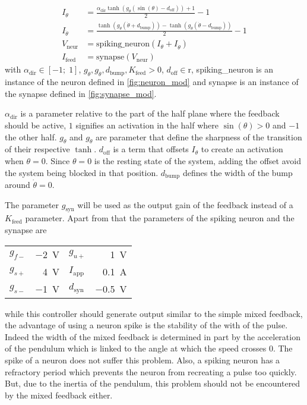 \begin{align}
    I_\theta &= \frac{\alpha_\text{dir}\tanh\left(g_\theta\left(\sin\left(\theta\right)-d_\text{off}\right)\right) + 1}{2} - 1\\
    I_{\dot{\theta}} &= \frac{\tanh\left(g_{\dot{\theta}}\left(\dot{\theta}+d_\text{bump}\right)\right) -\tanh\left(g_{\dot{\theta}}\left(\dot{\theta}-d_\text{bump}\right)\right)}{2}-1\\
    V_\text{neur} &= \text{spiking\_neuron}\left(I_\theta + I_{\dot{\theta}}\right)\\
    I_\text{feed} &= \text{synapse}\left(V_\text{neur}\right)
\end{align}
with $\alpha_\text{dir} \in \left[-1;\;1\right]$, $g_\theta, g_{\dot{\theta}}, d_\text{bump}, K_\text{feed} > 0$, $d_\text{off} \in \mathrm{r}$, spiking\_neuron is an instance of the neuron defined in \cref{fig:neuron_mod} and synapse is an instance of the synapse defined in \cref{fig:synapse_mod}.

$\alpha_\text{dir}$ is a parameter relative to the part of the half plane where the feedback should be active, $1$ signifies an activation in the half where $\sin\left(\theta\right)>0$ and $-1$ the other half. 
$g_\theta$ and $g_{\dot{\theta}}$ are parameter that define the sharpness of the transition of their respective $\tanh$.
$d_\text{off}$ is a term that offsets $I_\theta$ to create an activation when $\theta = 0$. Since $\theta = 0$ is the resting state of the system, adding the offset avoid the system being blocked in that position.
$d_\text{bump}$ defines the width of the bump around $\dot{\theta} = 0$. 

The parameter $g_{\text{syn}}$ will be used as the output gain of the feedback instead of a $K_\text{feed}$ parameter. Apart from that the parameters of the spiking neuron and the synapse are

{

\large\centering
\begin{tabular}{lr|lr}
    $g_{f-}$    & \qty{-2}{\volt}   & $g_{u+}$          & \qty{1}{\volt}\\
    $g_{s+}$    & \qty{4}{\volt}    & $I_\text{app}$    & \qty{0.1}{\ampere}\\
    $g_{s-}$    & \qty{-1}{\volt}   & $d_\text{syn}$    & \qty{-0.5}{\volt}\\
\end{tabular}

}

while this controller should generate output similar to the simple mixed feedback, the advantage of using a neuron spike is the stability of the with of the pulse. Indeed the width of the mixed feedback is determined in part by the acceleration of the pendulum which is linked to the angle at which the speed crosses $0$. The spike of a neuron does not suffer this problem. Also, a spiking neuron has a refractory period which prevents the neuron from recreating a pulse too quickly. But, due to the inertia of the pendulum, this problem should not be encountered by the mixed feedback either. 

